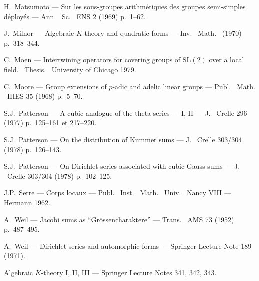 \documentclass[12pt,a4paper]{article}
\theoremstyle{plain}
\theoremstyle{definition}
\theoremstyle{remark}
\begin{document}
\begin{enumerate}[label={[\arabic*]}]
\item H.\ Matsumoto --- Sur les sous-groupes arithmétiques des groupes semi-simples déployés --- Ann.
\ Sc.
\ ENS 2 (1969) p.\ 1--62.

\item J.\ Milnor --- Algebraic $K$-theory and quadratic forms --- Inv.
\ Math.
\ (1970) p.\ 318--344.

\item C.\ Moen --- Intertwining operators for covering groups of $\mathrm{SL}(2)$ over a local field.
\ Thesis.
\ University of Chicago 1979.

\item C.\ Moore --- Group extensions of $p$-adic and adelic linear groups --- Publ.
\ Math.
\ IHES 35 (1968) p.\ 5--70.

\item S.J.\ Patterson --- A cubic analogue of the theta series --- I, II --- J.
\ Crelle 296 (1977) p.\ 125--161 et 217--220.

\item S.J.\ Patterson --- On the distribution of Kummer sums --- J.
\ Crelle 303/304 (1978) p.\ 126--143.

\item S.J.\ Patterson --- On Dirichlet series associated with cubic Gauss sums --- J.
\ Crelle 303/304 (1978) p.\ 102--125.

\item J.P.\ Serre --- Corps locaux --- Publ.
\ Inst.
\ Math.
\ Univ.
\ Nancy VIII --- Hermann 1962.

\item A.\ Weil --- Jacobi sums as ``Grössencharaktere'' --- Trans.
\ AMS 73 (1952) p.\ 487--495.

\item A.\ Weil --- Dirichlet series and automorphic forms --- Springer Lecture Note 189 (1971).

\item Algebraic $K$-theory I, II, III --- Springer Lecture Notes 341, 342, 343.
\end{enumerate}
\end{document}
